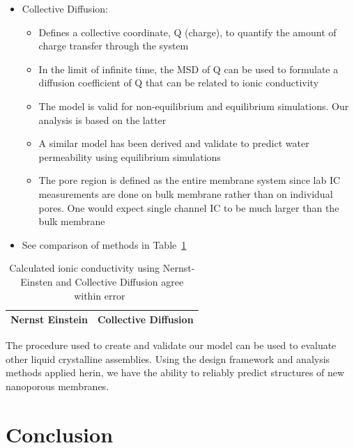 \documentclass{article}
\begin{document}
\begin{itemize}
\begin{itemize}
		\end{itemize}
		\item Collective Diffusion:  %
		\begin{itemize}
			\item Defines a collective coordinate, Q (charge), to quantify the amount of charge transfer through the system
			\item In the limit of infinite time, the MSD of Q can be used to formulate a diffusion coefficient of Q that can be related to ionic conductivity
			\item The model is valid for non-equilibrium and equilibrium simulations. Our analysis is based on the latter
			\item A similar model has been derived and validate to predict water permeability using equilibrium simulations
			\item The pore region is defined as the entire membrane system since lab IC measurements are done on bulk membrane rather than on individual pores. One would expect single channel IC to be much larger than the bulk membrane
		\end{itemize}                    
		\item See comparison of methods in Table~\ref{table:conductivity}
	\end{itemize}
	
	\begin{table}
	\centering
	\begin{tabular}{|c|c|}
	\hline
	Nernst Einstein & Collective Diffusion \\
	\hline
	\end{tabular}
	\caption{Calculated ionic conductivity using Nernst-Einsten and Collective Diffusion agree within error~\label{table:conductivity}}
	\end{table}

	The procedure used to create and validate our model can be used to evaluate other liquid crystalline assemblies. Using the design framework and analysis methods applied herin, we have the ability to reliably predict structures of new nanoporous membranes.


	\section{Conclusion}
	
\end{document}
